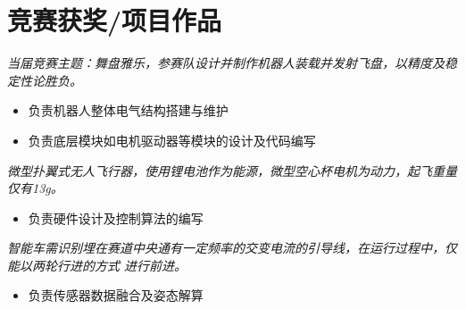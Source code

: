 \documentclass{resume}
\begin{document}

\section{竞赛获奖/项目作品}
\textit{当届竞赛主题：舞盘雅乐，参赛队设计并制作机器人装载并发射飞盘，以精度及稳定性论胜负。}

\begin{itemize}
  \item 负责机器人整体电气结构搭建与维护
  \item 负责底层模块如电机驱动器等模块的设计及代码编写 
\end{itemize}

\textit{微型扑翼式无人飞行器，使用锂电池作为能源，微型空心杯电机为动力，起飞重量仅有13g。}

\begin{itemize}
  \item 负责硬件设计及控制算法的编写 
\end{itemize}



\textit{智能车需识别埋在赛道中央通有一定频率的交变电流的引导线，在运行过程中，仅能以两轮行进的方式 进行前进。 }
\begin{itemize}
  \item 负责传感器数据融合及姿态解算  
\end{itemize}
\end{document}
